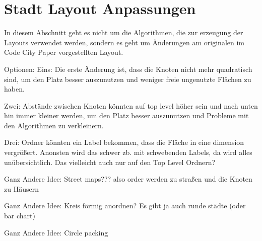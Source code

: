\section{Stadt Layout Anpassungen} \label{sec:SquarifyLayoutAnpassungen}

In diesem Abschnitt geht es nicht um die Algorithmen, die zur erzeugung der Layouts verwendet werden, sondern es geht um Änderungen am originalen im Code City Paper \cite{codeCity1} vorgestellten Layout. 

Optionen:
Eins:
Die erste Änderung ist, dass die Knoten nicht mehr quadratisch sind, um den Platz besser auszunutzen und weniger freie ungenutzte Flächen zu haben.

Zwei:
Abstände zwischen Knoten könnten auf top level höher sein und nach unten hin immer kleiner werden, um den Platz besser auszunutzen und Probleme mit den Algorithmen zu verkleinern.

Drei:
Ordner könnten ein Label bekommen, dass die Fläche in eine dimension vergrößert. Anonsten wird das schwer zb. mit schwebenden Labels, da wird alles unübersichtlich. Das vielleicht auch nur auf den Top Level Ordnern?

Ganz Andere Idee:
Street maps???
also order werden zu straßen und die Knoten zu Häusern

Ganz Andere Idee:
Kreis förmig anordnen? Es gibt ja auch runde städte
(oder bar chart)

Ganz Andere Idee:
Circle packing

